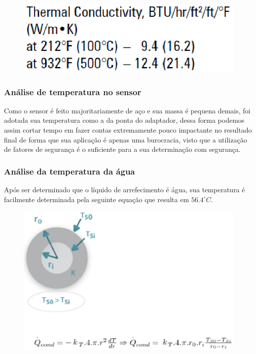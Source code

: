 \begin{figure}[!htb]                                                               
   \centering                                                                      
   \includegraphics[scale=0.4, keepaspectratio=true]{figuras/Teste14.eps}                       
\end{figure}

\subsubsection{Análise de temperatura no sensor}
Como o sensor é feito majoritariamente de aço e sua massa é pequena demais, foi adotada sua temperatura como a da ponta do adaptador, dessa forma podemos assim cortar tempo em fazer contas extremamente pouco impactante no resultado final de forma que sua aplicação é apenas uma burocracia, visto que a utilização de fatores de segurança é o suficiente para a sua determinação com segurança.

\subsubsection{Análise da temperatura da água}
Após ser determinado que o líquido de arrefecimento é água, sua temperatura é facilmente determinada pela seguinte equação que resulta em $56.4^{\circ}C$.

\begin{figure}[!htb]                                                               
   \centering                                                                      
   \includegraphics[scale=0.4, keepaspectratio=true]{figuras/Teste12.eps}                    
\end{figure}

